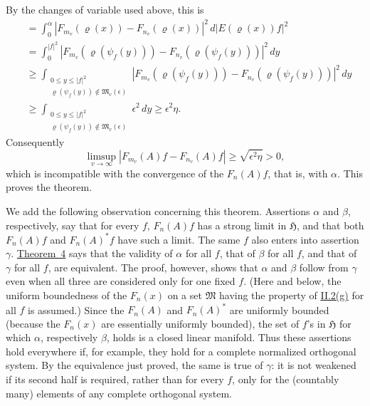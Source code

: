 \documentclass[12pt,b5paper,twoside]{article}
\begin{document}
By the changes of variable used above, this is
\begin{align*}
 &=\int_0^\alpha
   |F_{m_v}(\varrho(x))-F_{n_v}(\varrho(x))|^2\,
   d|E(\varrho(x))f|^2\\
 &=\int_0^{|f|^2}
   \left|F_{m_v}(\varrho(\psi_f(y)))
        -F_{n_v}(\varrho(\psi_f(y)))\right|^2\,dy\\
 &\geq
 \int_{\substack{0\leq y\leq|f|^2\\
       \varrho(\psi_f(y))\notin\mathfrak M_v(\epsilon)}}
   \left|F_{m_v}(\varrho(\psi_f(y)))
        -F_{n_v}(\varrho(\psi_f(y)))\right|^2\,dy\\
 &\geq
 \int_{\substack{0\leq y\leq|f|^2\\
       \varrho(\psi_f(y))\notin\mathfrak M_v(\epsilon)}}
   \epsilon^2\,dy
 \geq\epsilon^2\eta.
\end{align*}
Consequently
\[
 \limsup_{v\to\infty}|F_{m_v}(A)f-F_{n_v}(A)f|
 \geq\sqrt{\epsilon^2\eta}>0,
\]
which is incompatible with the convergence of the \(F_n(A)f\), that is,
with \hyperref[thm:4.alpha]{\(\alpha\)}.  This proves the theorem.

We add the following observation concerning this theorem.  Assertions
\hyperref[thm:4.alpha]{\(\alpha\)} and
\hyperref[thm:4.beta]{\(\beta\)}, respectively, say that for every \(f\),
\(F_n(A)f\) has a strong limit in \(\mathfrak H\), and that both
\(F_n(A)f\) and \(F_n(A)^*f\) have such a limit.  The same \(f\) also
enters into assertion \hyperref[thm:4.gamma]{\(\gamma\)}.
\hyperref[thm:4]{Theorem~4} says that
the validity of \hyperref[thm:4.alpha]{\(\alpha\)} for all \(f\), that of
\hyperref[thm:4.beta]{\(\beta\)} for all \(f\), and that of
\hyperref[thm:4.gamma]{\(\gamma\)} for all \(f\), are equivalent.  The
proof, however, shows that \hyperref[thm:4.alpha]{\(\alpha\)} and
\hyperref[thm:4.beta]{\(\beta\)} follow from
\hyperref[thm:4.gamma]{\(\gamma\)} even
when all three are considered only for one fixed \(f\).  (Here and below,
the uniform boundedness of the \(F_n(x)\) on a set \(\mathfrak M\) having
the property of \hyperref[prop:II.2.g]{II.2(g)} for all \(f\) is assumed.)
Since the \(F_n(A)\) and \(F_n(A)^*\) are uniformly bounded (because the
\(F_n(x)\) are essentially uniformly bounded), the set of \(f\)'s in
\(\mathfrak H\) for which \hyperref[thm:4.alpha]{\(\alpha\)},
respectively \hyperref[thm:4.beta]{\(\beta\)}, holds is
a closed linear manifold.  Thus these assertions hold everywhere if, for
example, they hold for a complete normalized orthogonal system.  By the
equivalence just proved, the same is true of
\hyperref[thm:4.gamma]{\(\gamma\)}: it is not weakened
if its second half is required, rather than for every \(f\), only for the
(countably many) elements of any complete orthogonal system.
\end{document}
